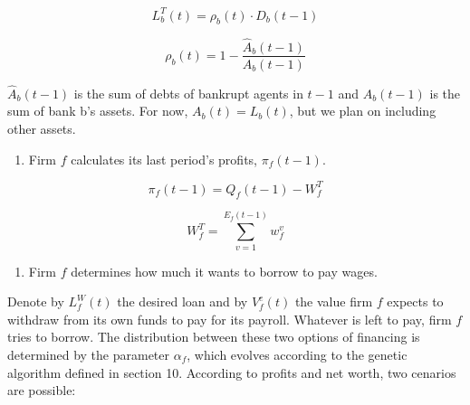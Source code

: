 \documentclass[11pt,]{article}
\providecommand{\tightlist}{%
\setlength{\itemsep}{0pt}\setlength{\parskip}{0pt}}
\begin{document}
\begin{equation}
L_b^T(t) = \rho_b(t) \cdot D_b(t-1)
\end{equation}

\begin{equation}
\rho_b(t) = 1 - \frac{\hat{A}_b(t-1)}{A_b(t-1)}
\end{equation}

\(\hat{A}_b(t-1)\) is the sum of debts of bankrupt agents in \(t-1\) and
\(A_b(t-1)\) is the sum of bank b's assets. For now,
\(A_b(t) = L_b(t)\), but we plan on including other assets.

\begin{enumerate}
\def\labelenumi{\alph{enumi}.}
\setcounter{enumi}{1}
\tightlist
\item
  Firm \(f\) calculates its last period's profits, \(\pi_f(t-1)\).
\end{enumerate}

\begin{equation}
\pi_f(t-1) = Q_f(t-1) - W_f^T 
\end{equation}

\begin{equation}
 W_f^T = \sum_{v=1}^{E_f(t-1)} w^v_f
\end{equation}

\begin{enumerate}
\def\labelenumi{\alph{enumi}.}
\setcounter{enumi}{2}
\tightlist
\item
  Firm \(f\) determines how much it wants to borrow to pay wages.
\end{enumerate}

Denote by \(L^W_f(t)\) the desired loan and by \(V^e_f(t)\) the value
firm \(f\) expects to withdraw from its own funds to pay for its
payroll. Whatever is left to pay, firm \(f\) tries to borrow. The
distribution between these two options of financing is determined by the
parameter \(\alpha_f\), which evolves according to the genetic algorithm
defined in section 10. According to profits and net worth, two cenarios
are possible:
\end{document}
